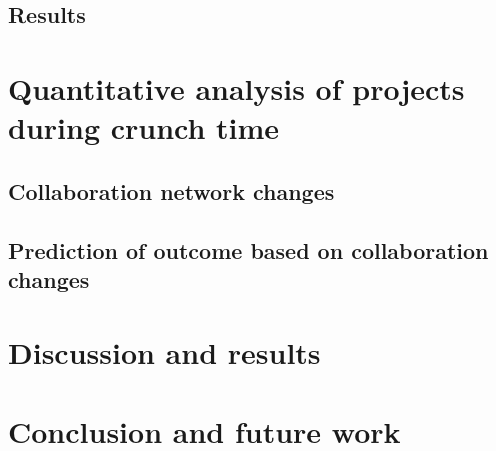 \subsection{Results}


\section{Quantitative analysis of projects during crunch time}
\subsection{Collaboration network changes}
\subsection{Prediction of outcome based on collaboration changes}

\section{Discussion and results}
\section{Conclusion and future work}
